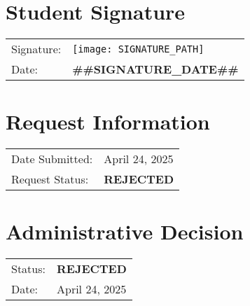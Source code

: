 \documentclass[12pt]{article}
\begin{document}
\section*{Student Signature}
\begin{tabular}{ll}
Signature: & \texttt{[image: SIGNATURE\_PATH]} \\
Date: & \textbf{##SIGNATURE_DATE##} \\
\end{tabular}

\vspace{0.5cm}

\section*{Request Information}
\begin{tabular}{ll}
Date Submitted: & April 24, 2025 \\
Request Status: & \textbf{REJECTED} \\
\end{tabular}

\section*{Administrative Decision}
            \begin{tabular}{l l}
            Status: & \textbf{REJECTED} \\
            Date: & April 24, 2025 \\
            \end{tabular}

\label{LastPage}
\end{document}
